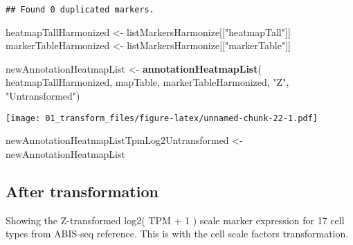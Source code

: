 \documentclass[
]{article}
\newenvironment{Shaded}{\begin{snugshade}}{\end{snugshade}}
\newcommand{\FunctionTok}[1]{\textcolor[rgb]{0.13,0.29,0.53}{\textbf{#1}}}
\newcommand{\NormalTok}[1]{#1}
\newcommand{\OtherTok}[1]{\textcolor[rgb]{0.56,0.35,0.01}{#1}}
\newcommand{\SpecialCharTok}[1]{\textcolor[rgb]{0.81,0.36,0.00}{\textbf{#1}}}
\newcommand{\StringTok}[1]{\textcolor[rgb]{0.31,0.60,0.02}{#1}}
\begin{document}
\begin{verbatim}
## Found 0 duplicated markers.
\end{verbatim}

\begin{Shaded}
\begin{Highlighting}[]
\NormalTok{heatmapTallHarmonized }\OtherTok{\textless{}{-}}\NormalTok{ listMarkersHarmonize[[}\StringTok{"heatmapTall"}\NormalTok{]]}
\NormalTok{markerTableHarmonized }\OtherTok{\textless{}{-}}\NormalTok{ listMarkersHarmonize[[}\StringTok{"markerTable"}\NormalTok{]]}
\end{Highlighting}
\end{Shaded}

\begin{Shaded}
\begin{Highlighting}[]
\NormalTok{newAnnotationHeatmapList }\OtherTok{\textless{}{-}} \FunctionTok{annotationHeatmapList}\NormalTok{(}
\NormalTok{  heatmapTallHarmonized, mapTable, markerTableHarmonized, }\StringTok{"Z"}\NormalTok{, }\StringTok{"Untransformed"}\NormalTok{)}
\end{Highlighting}
\end{Shaded}

\begin{Shaded}
\end{Shaded}

\texttt{[image: 01\_transform\_files/figure-latex/unnamed-chunk-22-1.pdf]}

\begin{Shaded}
\begin{Highlighting}[]
\NormalTok{newAnnotationHeatmapListTpmLog2Untransformed }\OtherTok{\textless{}{-}}\NormalTok{ newAnnotationHeatmapList}
\end{Highlighting}
\end{Shaded}

\hypertarget{after-transformation-1}{%
\subsection{After transformation}\label{after-transformation-1}}

Showing the Z-transformed log2( TPM + 1 ) scale marker expression for 17
cell types from ABIS-seq reference. This is with the cell scale factors
transformation.
\end{document}

